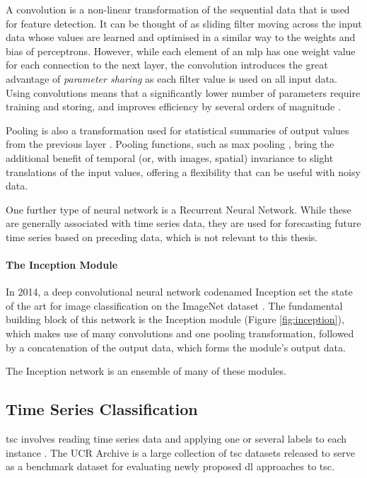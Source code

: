 A convolution is a non-linear transformation of the sequential data that is used for feature detection. It can be thought of as sliding filter moving across the input data whose values are learned and optimised in a similar way to the weights and bias of perceptrons. However, while each element of an \ac{mlp} has one weight value for each connection to the next layer, the convolution introduces the great advantage of \textit{parameter sharing} as each filter value is used on all input data. Using convolutions means that a significantly lower number of parameters require training and storing, and improves efficiency by several orders of magnitude \cite[]{goodfellow_deep_2016}.

Pooling is also a transformation used for statistical summaries of output values from the previous layer \cite[]{goodfellow_deep_2016}. Pooling functions, such as max pooling \cite[]{zhou_computation_1988}, bring the additional benefit of temporal (or, with images, spatial) invariance to slight translations of the input values, offering a flexibility that can be useful with noisy data.

One further type of neural network is a Recurrent Neural Network. While these are generally associated with time series data, they are used for forecasting future time series based on preceding data, which is not relevant to this thesis.

\paragraph*{The Inception Module}
In 2014, a deep convolutional neural network codenamed Inception \cite[]{szegedy_going_2014} set the state of the art for image classification on the ImageNet dataset \cite[]{russakovsky_imagenet_2015}. The fundamental building block of this network is the Inception module (Figure \ref{fig:inception}), which makes use of many convolutions and one pooling transformation, followed by a concatenation of the output data, which forms the module's output data.



The Inception network is an ensemble of many of these modules.

\subsection{Time Series Classification}\label{sec:tsc}
\ac{tsc} involves reading time series data and applying one or several labels to each instance \cite{fawaz_inceptiontime_2019}. The UCR Archive \cite{dau_ucr_2019} is a large collection of \ac{tsc} datasets released to serve as a benchmark dataset for evaluating newly proposed \ac{dl} approaches to \ac{tsc}.

